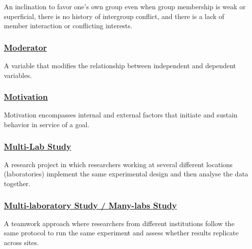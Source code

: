 \documentclass[
  letterpaper,
]{book}
\begin{document}
An inclination to favor one's own group even when group membership is
weak or superficial, there is no history of intergroup conflict, and
there is a lack of member interaction or conflicting interests.

\subsubsection*{\texorpdfstring{\hyperref[def-moderator]{Moderator}}{Moderator}}\label{moderator}

A variable that modifies the relationship between independent and
dependent variables.

\subsubsection*{\texorpdfstring{\hyperref[def-motivation]{Motivation}}{Motivation}}\label{motivation}

Motivation encompasses internal and external factors that initiate and
sustain behavior in service of a goal.

\subsubsection*{\texorpdfstring{\hyperref[def-multilabstudy]{Multi-Lab
Study}}{Multi-Lab Study}}\label{multi-lab-study}

A research project in which researchers working at several different
locations (laboratories) implement the same experimental design and then
analyse the data together.

\subsubsection*{\texorpdfstring{\hyperref[def-multilaboratory]{Multi-laboratory
Study / Many-labs
Study}}{Multi-laboratory Study / Many-labs Study}}\label{multi-laboratory-study-many-labs-study}

A teamwork approach where researchers from different institutions follow
the same protocol to run the same experiment and assess whether results
replicate across sites.
\end{document}

